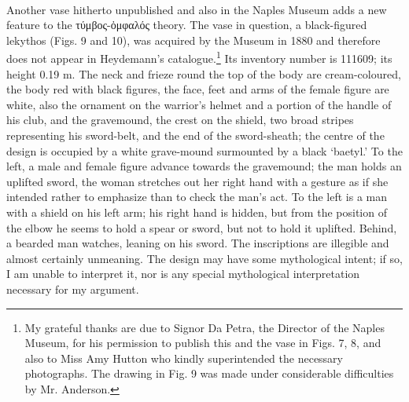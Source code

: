 \documentclass[a4paper, 11pt, oneside, polutonikogreek, english]{article}
\begin{document}
\paragraph{}
Another vase hitherto unpublished and also in the Naples Museum adds a new feature to the τύμβος-ὀμφαλός theory. The vase in question, a black-figured lekythos (Figs. 9 and 10), was acquired by the Museum in 1880 and therefore does not appear in Heydemann's catalogue.\footnote{My grateful thanks are due to Signor Da Petra, the Director of the Naples Museum, for his permission to publish this and the vase in Figs. 7, 8, and also to Miss Amy Hutton who kindly superintended the necessary photographs. The drawing in Fig. 9 was made under considerable difficulties by Mr. Anderson.} Its inventory number is 111609; its height 0.19 m. The neck and frieze round the top of the body are cream-coloured, the body red with black figures, the face, feet and arms of the female figure are white, also the ornament on the warrior's helmet and a portion of the handle of his club, and the gravemound, the crest on the shield, two broad stripes representing his sword-belt, and the end of the sword-sheath; the centre of the design is occupied by a white grave-mound surmounted by a black `baetyl.' To the left, a male and female figure advance towards the gravemound; the man holds an uplifted sword, the woman stretches out her right hand with a gesture as if she intended rather to emphasize than to check the man's act. To the left is a man with a shield on his left arm; his right hand is hidden, but from the position of the elbow he seems to hold a spear or sword, but not to hold it uplifted. Behind, a bearded man watches, leaning on his sword. The inscriptions are illegible and almost certainly unmeaning. The design may have some mythological intent; if so, I am unable to interpret it, nor is any special mythological interpretation necessary for my argument.
\end{document}
